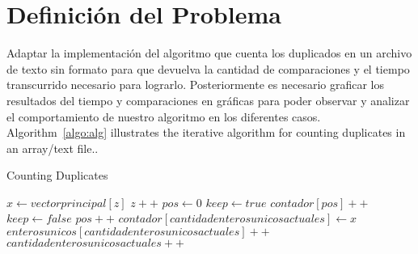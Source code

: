 \section{Definición del Problema}
Adaptar la implementación del algoritmo que cuenta los duplicados en un archivo de texto sin formato para que devuelva la cantidad de comparaciones y el tiempo transcurrido necesario para lograrlo. Posteriormente es necesario graficar los resultados del tiempo y comparaciones en gráficas para poder observar y analizar el comportamiento de nuestro algoritmo en los diferentes casos. \\


Algorithm~\ref{algo:alg} illustrates the iterative algorithm for
counting duplicates in an array/text file..

\begin{algorithm}[H]	%
	\caption{Counting Duplicates}	%
	\begin{algorithmic}
	    \STATE $x \gets vectorprincipal[z]$
	    \STATE $z++$
	    \STATE $pos \gets 0$
	    \STATE $keep \gets true$
	            \STATE $contador[pos]++$
	            \STATE $keep \gets false$
		    \ELSE
		        \STATE $pos++$
		    \ENDIF
		\ENDWHILE
		    \STATE $contador[cantidadenterosunicosactuales]\gets x$
		    \STATE $enterosunicos[cantidadenterosunicosactuales]++$
		    \STATE $cantidadenterosunicosactuales++$
		\ENDIF
    \ENDWHILE
	\end{algorithmic}
	\label{algo:alg}	%
\end{algorithm}
